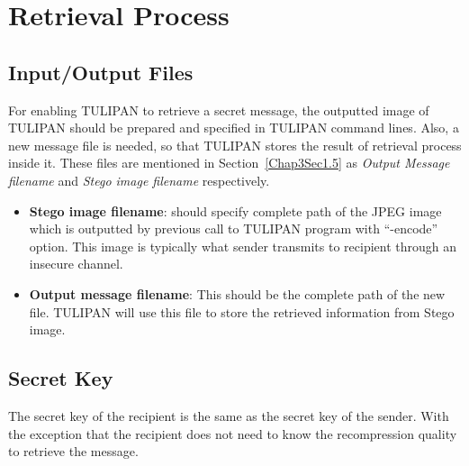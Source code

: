 \section{Retrieval Process}
\label{Chap3Sec3}
\subsection{Input/Output Files}

For enabling TULIPAN to retrieve a secret message, the outputted image of TULIPAN should be prepared and specified in TULIPAN command lines. Also, a new message file is needed, so that TULIPAN stores the result of retrieval process inside it. These files are mentioned in Section~\ref{Chap3Sec1.5} as {\it Output Message filename} and {\it Stego image filename} respectively.

\begin{itemize}
  \item {\bf Stego image filename}: should specify complete path of the JPEG image which is outputted by previous call to TULIPAN program with ``-encode'' option. This image is typically what sender transmits to recipient through an insecure channel.

  \item {\bf Output message filename}: This should be the complete path of the new file. TULIPAN will use this file to store the retrieved information from Stego image.
\end{itemize}

\subsection{Secret Key}
The secret key of the recipient is the same as the secret key of the sender. With the exception that the recipient does not need to know the recompression quality to retrieve the message.

